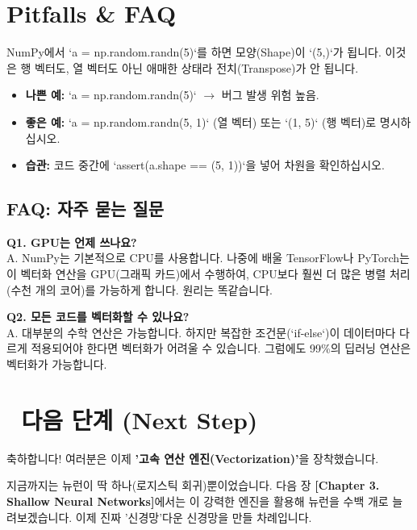 \documentclass[11pt,a4paper]{book}
\theoremstyle{definition}
\begin{document}
\section{Pitfalls \& FAQ}

\begin{warningbox}[title={Rank-1 Array의 함정}]
NumPy에서 `a = np.random.randn(5)`를 하면 모양(Shape)이 `(5,)`가 됩니다.
이것은 행 벡터도, 열 벡터도 아닌 애매한 상태라 전치(Transpose)가 안 됩니다.
\begin{itemize}
    \item \textbf{나쁜 예:} `a = np.random.randn(5)` $\rightarrow$ 버그 발생 위험 높음.
    \item \textbf{좋은 예:} `a = np.random.randn(5, 1)` (열 벡터) 또는 `(1, 5)` (행 벡터)로 명시하십시오.
    \item \textbf{습관:} 코드 중간에 `assert(a.shape == (5, 1))`을 넣어 차원을 확인하십시오.
\end{itemize}
\end{warningbox}

\subsection*{FAQ: 자주 묻는 질문}
\textbf{Q1. GPU는 언제 쓰나요?} \\
A. NumPy는 기본적으로 CPU를 사용합니다. 나중에 배울 TensorFlow나 PyTorch는 이 벡터화 연산을 GPU(그래픽 카드)에서 수행하여, CPU보다 훨씬 더 많은 병렬 처리(수천 개의 코어)를 가능하게 합니다. 원리는 똑같습니다.

\textbf{Q2. 모든 코드를 벡터화할 수 있나요?} \\
A. 대부분의 수학 연산은 가능합니다. 하지만 복잡한 조건문(`if-else`)이 데이터마다 다르게 적용되어야 한다면 벡터화가 어려울 수 있습니다. 그럼에도 99\%의 딥러닝 연산은 벡터화가 가능합니다.

\section*{🔗 다음 단계 (Next Step)}
축하합니다! 여러분은 이제 \textbf{'고속 연산 엔진(Vectorization)'}을 장착했습니다. 

지금까지는 뉴런이 딱 하나(로지스틱 회귀)뿐이었습니다. 다음 장 \textbf{[Chapter 3. Shallow Neural Networks]}에서는 이 강력한 엔진을 활용해 뉴런을 수백 개로 늘려보겠습니다. 이제 진짜 '신경망'다운 신경망을 만들 차례입니다.

\vspace{0.5cm}
\end{document}
